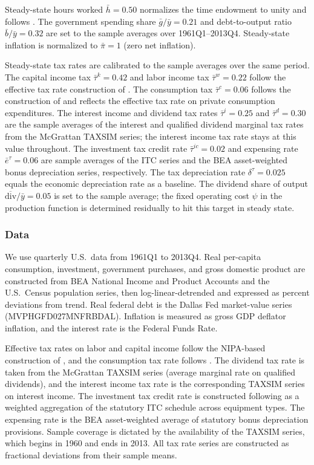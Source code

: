 \documentclass[article,11pt,letterpaper,fleqn]{article}
\theoremstyle{definition}
\numberwithin{equation}{section}
\begin{document}
Steady-state hours worked $\bar{h} = 0.50$ normalizes the time endowment to unity and follows \citet{Zubairy2014}. The government spending share $\bar{g}/\bar{y} = 0.21$ and debt-to-output ratio $\bar{b}/\bar{y} = 0.32$ are set to the sample averages over 1961Q1--2013Q4. Steady-state inflation is normalized to $\bar{\pi} = 1$ (zero net inflation).

Steady-state tax rates are calibrated to the sample averages over the same period. The capital income tax $\bar{\tau}^k = 0.42$ and labor income tax $\bar{\tau}^w = 0.22$ follow the effective tax rate construction of \citet{Jones2002}. The consumption tax $\bar{\tau}^c = 0.06$ follows the construction of \citet{Mendoza_et_al_1994} and reflects the effective tax rate on private consumption expenditures. The interest income and dividend tax rates $\bar{\tau}^i = 0.25$ and $\bar{\tau}^d = 0.30$ are the sample averages of the interest and qualified dividend marginal tax rates from the McGrattan TAXSIM series; the interest income tax rate stays at this value throughout. The investment tax credit rate $\bar{\tau}^{ic} = 0.02$ and expensing rate $\bar{e}^{\tau} = 0.06$ are sample averages of the \citet{House_Shapiro_2008} ITC series and the BEA asset-weighted bonus depreciation series, respectively. The tax depreciation rate $\delta^{\tau} = 0.025$ equals the economic depreciation rate as a baseline. The dividend share of output $\overline{\text{div}}/\bar{y} = 0.05$ is set to the sample average; the fixed operating cost $\psi$ in the production function is determined residually to hit this target in steady state.


\subsubsection{Data}
\label{sec:data}

We use quarterly U.S.\ data from 1961Q1 to 2013Q4. Real per-capita consumption, investment, government purchases, and gross domestic product are constructed from BEA National Income and Product Accounts and the U.S.\ Census population series, then log-linear-detrended and expressed as percent deviations from trend. Real federal debt is the Dallas Fed market-value series (MVPHGFD027MNFRBDAL). Inflation is measured as gross GDP deflator inflation, and the interest rate is the Federal Funds Rate.

Effective tax rates on labor and capital income follow the NIPA-based construction of \citet{Jones2002}, and the consumption tax rate follows \citet{Mendoza_et_al_1994}. The dividend tax rate is taken from the McGrattan TAXSIM series (average marginal rate on qualified dividends), and the interest income tax rate is the corresponding TAXSIM series on interest income. The investment tax credit rate is constructed following \citet{House_Shapiro_2008} as a weighted aggregation of the statutory ITC schedule across equipment types. The expensing rate is the BEA asset-weighted average of statutory bonus depreciation provisions. Sample coverage is dictated by the availability of the TAXSIM series, which begins in 1960 and ends in 2013. All tax rate series are constructed as fractional deviations from their sample means.
\end{document}
